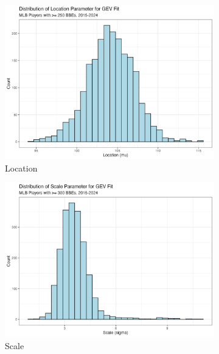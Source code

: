 \documentclass[12pt, TexShade, letterpaper]{report}
\begin{document}
\begin{figure}[ht]
    \centering
    \begin{subfigure}[]{0.45\textwidth}
        \centering
        \includegraphics[width=\textwidth]{plots/location.png}
        \caption{Location}
    \end{subfigure}
    \begin{subfigure}[]{0.45\textwidth}
        \centering
        \includegraphics[width=\textwidth]{plots/scale.png}
        \caption{Scale}
    \end{subfigure}
    \begin{subfigure}[]{0.45\textwidth}
        \centering

\end{subfigure}
\end{figure}
\end{document}

